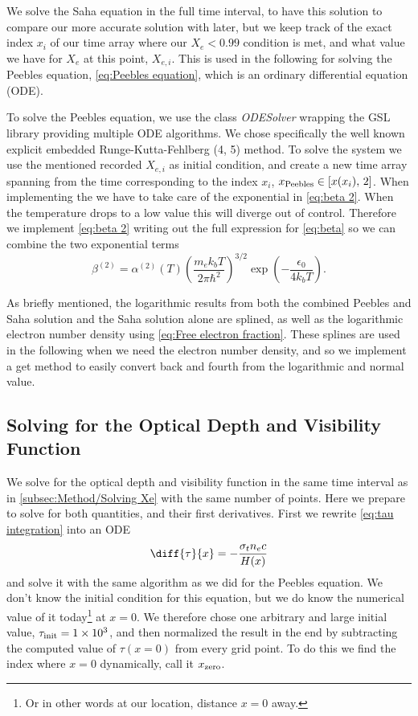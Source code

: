 \documentclass[10pt,a4paper]{article}
\begin{document}
We solve the Saha equation in the full time interval, to have this solution to compare our more accurate solution with later, but we keep track of the exact index $x_i$ of our time array where our $X_e< 0.99$ condition is met, and what value we have for $X_e$ at this point, $X_{e,i}$. This is used in the following for solving the Peebles equation, \cref{eq:Peebles equation}, which is an ordinary differential equation (ODE).

To solve the Peebles equation, we use the class \textit{ODESolver} wrapping the GSL library providing multiple ODE algorithms. We chose specifically the well known explicit embedded Runge-Kutta-Fehlberg (4, 5) method\citep{gsl-doc}. To solve the system we use the mentioned recorded $X_{e,i}$ as initial condition, and create a new time array spanning from the time corresponding to the index $x_i$, $x_{\rm{Peebles}} \in \left[x(x_i),\, 2\right]$. When implementing the  we have to take care of the exponential in \cref{eq:beta 2}. When the temperature drops to a low value this will diverge out of control. Therefore we implement \cref{eq:beta 2} writing out the full expression for \cref{eq:beta} so we can combine the two exponential terms
\begin{equation*}
    \beta^{(2)} = \alpha^{(2)}(T) \left(\frac{m_e k_b T}{2\pi\hbar^2}\right)^{3/2} \exp(-\frac{\epsilon_0}{4k_b T}).
\end{equation*}

As briefly mentioned, the logarithmic results from both the combined Peebles and Saha solution and the Saha solution alone are splined, as well as the logarithmic electron number density using \cref{eq:Free electron fraction}. These splines are used in the following when we need the electron number density, and so we implement a get method to easily convert back and fourth from the logarithmic and normal value.

\subsection{Solving for the Optical Depth and Visibility Function}
\label{subsec:method/tau and g}
We solve for the optical depth and visibility function in the same time interval as in \cref{subsec:Method/Solving Xe} with the same number of points. Here we prepare to solve for both quantities, and their first derivatives. First we rewrite \cref{eq:tau integration} into an ODE
\begin{equation}
    \diff{\tau }{x} = -\frac{\sigma_t n_e c}{H(x)}
    \label{eq: tau ODE}
\end{equation}
and solve it with the same algorithm as we did for the Peebles equation. We don't know the initial condition for this equation, but we do know the numerical value of it today\footnote{Or in other words at our location, distance $x=0$ away.} at $x=0$. We therefore chose one arbitrary and large initial value, $\tau_{\rm{init}} = \num{1e3}$, and then normalized the result in the end by subtracting the computed value of $\tau(x=0)$ from every grid point. To do this we find the index where $x=0$ dynamically, call it $x_{\rm{zero}}$.
\end{document}

